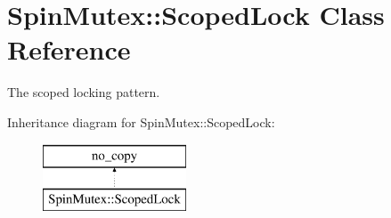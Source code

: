 \hypertarget{classSpinMutex_1_1ScopedLock}{}\section{Spin\+Mutex\+:\+:Scoped\+Lock Class Reference}
\label{classSpinMutex_1_1ScopedLock}


The scoped locking pattern.  


Inheritance diagram for Spin\+Mutex\+:\+:Scoped\+Lock\+:\begin{figure}[H]
\begin{center}
\leavevmode
\includegraphics[height=2.000000cm]{classSpinMutex_1_1ScopedLock}
\end{center}
\end{figure}
